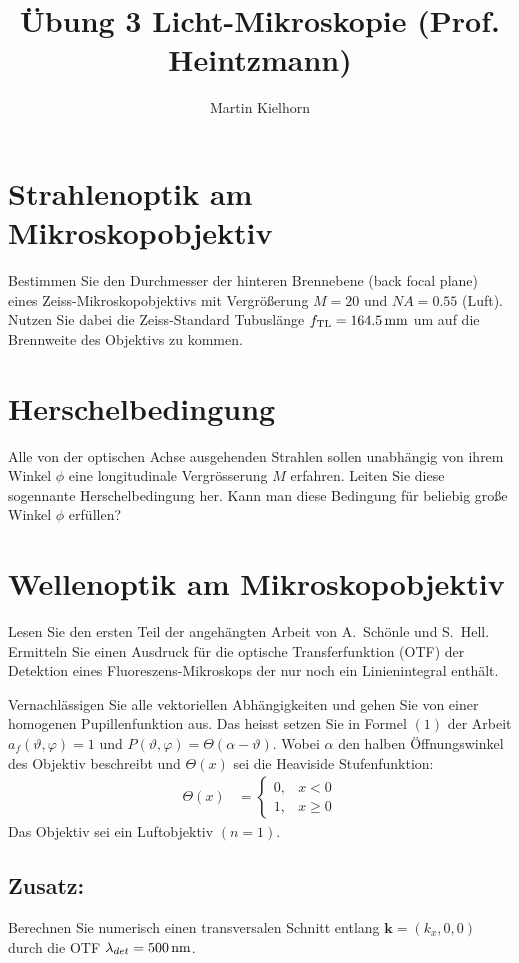 \documentclass{article}
\begin{document}
\author{Martin Kielhorn}
\title{\"Ubung 3 Licht-Mikroskopie (Prof. Heintzmann)}
\maketitle

\section{Strahlenoptik am Mikroskopobjektiv}
Bestimmen Sie den Durchmesser der hinteren Brennebene (back focal
plane) eines Zeiss-Mikroskopobjektivs mit Vergr\"o\ss erung $M=20$ und
$NA=0.55$ (Luft). Nutzen Sie dabei die Zeiss-Standard Tubusl\"ange
$f_\textrm{TL}=\unit[164.5]{mm}$ um auf die Brennweite des Objektivs
zu kommen.

\section{Herschelbedingung}
Alle von der optischen Achse ausgehenden Strahlen sollen unabh\"angig
von ihrem Winkel $\phi$ eine longitudinale Vergr\"osserung $M$
erfahren. Leiten Sie diese sogennante Herschelbedingung her. Kann man
diese Bedingung f\"ur beliebig gro\ss e Winkel $\phi$ erf\"ullen?

\section{Wellenoptik am Mikroskopobjektiv}
Lesen Sie den ersten Teil der angeh\"angten Arbeit von A.~Sch\"onle
und S.~Hell. Ermitteln Sie einen Ausdruck f\"ur die optische
Transferfunktion (OTF) der Detektion eines Fluoreszens-Mikroskops der
nur noch ein Linienintegral enth\"alt.

Vernachl\"assigen Sie alle vektoriellen Abh\"angigkeiten und gehen Sie
von einer homogenen Pupillenfunktion aus. Das heisst setzen Sie in
Formel $(1)$ der Arbeit $a_f(\vartheta,\varphi)=1$ und
$P(\vartheta,\varphi)=\Theta(\alpha-\vartheta)$. Wobei $\alpha$ den halben
\"Offnungswinkel des Objektiv beschreibt und $\Theta(x)$ sei die
Heaviside Stufenfunktion:
\begin{align}
  \Theta(x)&=\begin{cases}
  0, & x<0 \\
  1, & x \ge 0
  \end{cases}
\end{align}
Das Objektiv sei ein Luftobjektiv $(n=1)$.

\subsection*{Zusatz:}
Berechnen Sie numerisch einen transversalen Schnitt entlang
$\mathbf{k}=(k_x,0,0)$ durch die OTF $\lambda_{det}=\unit[500]{nm}$.


\end{document}

